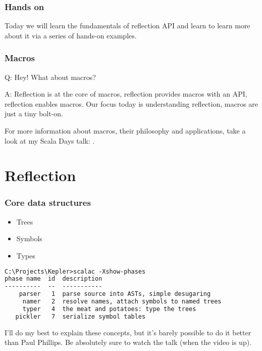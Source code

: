 \documentclass[hyperref={bookmarks=false}]{beamer}
\begin{document}
\begin{frame}[fragile]
\frametitle{Hands on}

Today we will learn the fundamentals of reflection API and learn to learn more about it
via a series of hands-on examples.

\end{frame}

\begin{frame}[fragile]
\frametitle{Macros}

Q: Hey! What about macros?

A: Reflection is at the core of macros, reflection provides macros with an API, reflection enables macros.
Our focus today is understanding reflection, macros are just a tiny bolt-on.

For more information about macros, their philosophy and applications, take a look at my Scala Days talk:
.

\end{frame}

\section{Reflection}

\begin{frame}[fragile]
\frametitle{Core data structures}

\begin{itemize}
\item Trees
\item Symbols
\item Types
\end{itemize}

\begin{lstlisting}[language=XML]
C:\Projects\Kepler>scalac -Xshow-phases
phase name  id  description
----------  --  -----------
    parser   1  parse source into ASTs, simple desugaring
     namer   2  resolve names, attach symbols to named trees
     typer   4  the meat and potatoes: type the trees
   pickler   7  serialize symbol tables
\end{lstlisting}

I'll do my best to explain these concepts, but it's barely possible to do it better than Paul Phillips.
Be absolutely sure to watch the  talk (when the video is up).
\end{frame}
\end{document}
